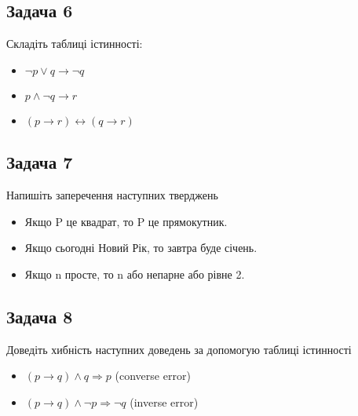 \documentclass{article}
\begin{document}
\subsection*{Задача 6}
Складіть таблиці істинності:
\begin{itemize}
    \item $\lnot p \lor q \rightarrow \lnot q$
    \item $p \land \lnot q \rightarrow r $
    \item $(p \rightarrow r) \leftrightarrow (q \rightarrow r)$
\end{itemize}


\subsection*{Задача 7}
Напишіть заперечення наступних тверджень
\begin{itemize}
    \item Якщо P це квадрат, то P це прямокутник.
    \item Якщо сьогодні Новий Рік, то завтра буде січень.
    \item Якщо n просте, то n або непарне або рівне 2.
\end{itemize}

\subsection*{Задача 8}
Доведіть хибність наступних доведень за допомогую таблиці істинності
\begin{itemize}
    \item $(p \rightarrow q) \land q \Rightarrow p$ (converse error)
    \item $(p \rightarrow q) \land \lnot p \Rightarrow \lnot q$ (inverse error)
\end{itemize}
\end{document}
